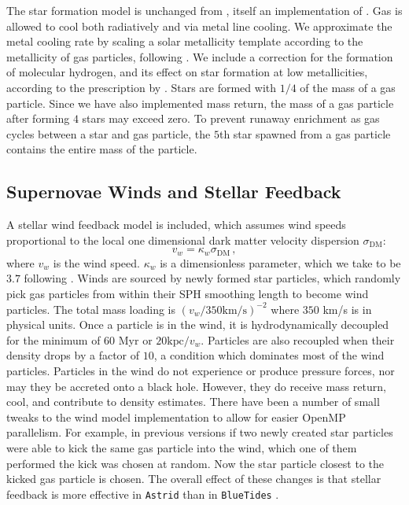 \documentclass[fleqn,usenatbib]{mnras}
\def\astrid{\texttt{Astrid} }
\def\bluetides{\texttt{BlueTides} }
\begin{document}
The star formation model is unchanged from \cite{Feng:2016}, itself an implementation of \cite{2003MNRAS.339..289S}. Gas is allowed to cool both radiatively \citep{1996ApJS..105...19K} and via metal line cooling. We approximate the metal cooling rate by scaling a solar metallicity template according to the metallicity of gas particles, following \cite{Vogelsberger:2014}.
We include a correction for the formation of molecular hydrogen, and its effect on star formation at low metallicities, according to the prescription by \cite{2011ApJ...729...36K}. Stars are formed with $1/4$ of the mass of a gas particle. Since we have also implemented mass return, the mass of a gas particle after forming $4$ stars may exceed zero. To prevent runaway enrichment as gas cycles between a star and gas particle, the $5$th star spawned from a gas particle contains the entire mass of the particle.

\subsection{Supernovae Winds and Stellar Feedback}

A stellar wind feedback model \citep{2010MNRAS.406..208O} is included, which assumes wind speeds proportional to the local one dimensional dark matter velocity dispersion $\sigma_\mathrm{DM}$:
\begin{equation}
v_w = \kappa_w \sigma_\mathrm{DM} \,,
\end{equation}
where $v_w$ is the wind speed. $\kappa_w$ is a dimensionless parameter, which we take to be $3.7$ following \cite{Vogelsberger:2013}.
Winds are sourced by newly formed star particles, which randomly pick gas particles from within their SPH smoothing length to become wind particles. The total mass loading is $(v_w/ 350 \mathrm{km/s})^{-2}$ where $350$ km/s is in physical units. Once a particle is in the wind, it is hydrodynamically decoupled for the minimum of $60$ Myr or $20 \mathrm{kpc} / v_w$. Particles are also recoupled when their density drops by a factor of $10$, a condition which dominates most of the wind particles. Particles in the wind do not experience or produce pressure forces, nor may they be accreted onto a black hole. However, they do receive mass return, cool, and contribute to density estimates. There have been a number of small tweaks to the wind model implementation to allow for easier OpenMP parallelism. For example, in previous versions if two newly created star particles were able to kick the same gas particle into the wind, which one of them performed the kick was chosen at random. Now the star particle closest to the kicked gas particle is chosen. The overall effect of these changes is that stellar feedback is more effective in \astrid than in \bluetides.
\end{document}
